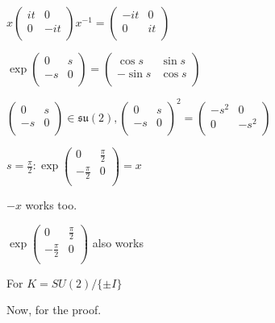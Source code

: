 \documentclass{article}
\theoremstyle{definition}
\begin{document}
\(x \begin{pmatrix}
    it &  0 \\
    0 &  -it \\
\end{pmatrix}x ^{-1} = \begin{pmatrix}
    -it &  0 \\
    0 &  it \\
\end{pmatrix}\)

\(\exp \begin{pmatrix}
    0 &  s \\
    -s &  0 \\
\end{pmatrix}=\begin{pmatrix}
    \cos s &  \sin s \\
    -\sin s &  \cos s \\
\end{pmatrix}\)

\(\begin{pmatrix}
    0 &  s \\
    -s &  0 \\
\end{pmatrix}\in \mathfrak{su}(2), \begin{pmatrix}
    0 &  s \\
    -s &  0 \\
\end{pmatrix}^2 = \begin{pmatrix}
    -s^2 &  0 \\
    0 &  -s^2 \\
\end{pmatrix}\)

\(s = \frac{\pi}{2}: \exp \begin{pmatrix}
    0 &  \frac{\pi}{2} \\
    -\frac{\pi}{2} & 0  \\
\end{pmatrix}=x\) 

\(-x\) works too.

\(\exp \begin{pmatrix}
    0 &  \frac{\pi}{2} \\
    -\frac{\pi}{2} & 0  \\
\end{pmatrix}\) also works

For \(K = SU(2) / \{ \pm I \} \) 

Now, for the proof.
\end{document}
